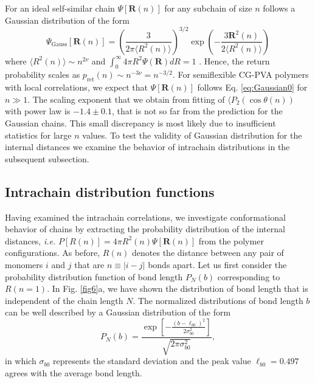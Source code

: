 \documentclass[pre,showpacs,notitlepage,twocolumn]{revtex4-1}
\newcommand{\bR}{\mathbf{R}}
\begin{document}
   For an  ideal  self-similar chain  $\Psi [\bR(n)]$ for any subchain of size $n$ follows a Gaussian distribution of the form 
  \begin{equation}
 \Psi_{\mathrm{Gauss}} [\bR(n)]=  \left(\frac{3}{2 \pi \langle  R^2(n)\rangle} \right)^{3/2} \exp \left(-\frac{3 \bR^2(n)}{2 \langle  R^2(n) \rangle}\right)
 \label{eq:Gaussian0}
\end{equation}
where  $\langle R^2(n)\rangle \sim n^{2 \nu}$ and $\int_0^{\infty} 4 \pi R^2  \Psi (\bR)  dR =1$ \cite{Rubinstein,polymerDoi}.
Hence, the return probability scales as $p_{\mathrm{ret}}(n) \sim n^{-3 \nu} =  n^{-3/2} $. 
For semiflexible CG-PVA polymers with local correlations, we expect that $\Psi [\bR(n)]$ follows Eq. \ref{eq:Gaussian0} for $n \gg 1$.
The scaling exponent that we obtain from fitting of $\langle P_2( \cos \theta(n))$ with power law is $-1.4 \pm 0.1$,  that is not so far from the prediction for the Gaussian chains.
This small discrepancy is most likely due to insufficient statistics for large $n$ values.  To test the validity of Gaussian distribution for the internal distances we examine the behavior of  intrachain distributions in the
subsequent subsection.
 


\subsection*{Intrachain distribution functions}

 

 
 

 Having examined the intrachain correlations, we investigate conformational behavior of chains by extracting  the   probability distribution of the internal distances, {\it i.e.}  $P[R(n)]=4 \pi R^2(n) \Psi [\bR(n)]$ from the 
  polymer configurations.
As before, $R(n)$ denotes the distance between any pair of monomers $i$ and $j$ that are  $n \equiv |i-j|$ bonds apart. Let us first  consider the probability distribution function of bond length $P_N (b)$ corresponding to $R(n=1)$.
In Fig. \ref{fig6}a, we have shown the distribution of bond length  that is independent of the chain length $N$.    
The normalized distributions of bond length $b$ can be well described by a  Gaussian distribution of the form
%
\begin{equation}
P_N (b)=    \frac{  \exp[ -\frac{(b-  \ell_{b0})^2}{2  \sigma_{b0}^2} ]}{\sqrt{2\pi \sigma_{b0}^2} },
\label{eq:Gaussianlb}
\end{equation}
%
in which $\sigma_{b0}$ represents the  standard deviation and the peak value $\ell_{b0}=0.497$ agrees with the average bond length.
 
\end{document}
